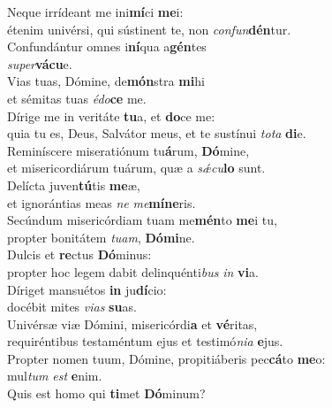 \evenverse Neque irrídeant me ini\textbf{mí}ci \textbf{me}i:~\*\\
\evenverse étenim univérsi, qui sústinent te, non \textit{con}\textit{fun}\textbf{dén}tur.\\
\oddverse Confundántur omnes i\textbf{ní}qua a\textbf{gén}tes~\*\\
\oddverse \textit{su}\textit{per}\textbf{vá}\textbf{cu}e.\\
\evenverse Vias tuas, Dómine, de\textbf{món}stra \textbf{mi}hi~\*\\
\evenverse et sémitas tuas \textit{é}\textit{do}\textbf{ce} me.\\
\oddverse Dírige me in veritáte \textbf{tu}a, et \textbf{do}ce me:~\*\\
\oddverse quia tu es, Deus, Salvátor meus, et te sustínui \textit{to}\textit{ta} \textbf{di}e.\\
\evenverse Reminíscere miseratiónum tu\textbf{á}rum, \textbf{Dó}mine,~\*\\
\evenverse et misericordiárum tuárum, quæ a \textit{sǽ}\textit{cu}\textbf{lo} sunt.\\
\oddverse Delícta juven\textbf{tú}tis \textbf{me}æ,~\*\\
\oddverse et ignorántias meas \textit{ne} \textit{me}\textbf{mí}\textbf{ne}ris.\\
\evenverse Secúndum misericórdiam tuam me\textbf{mén}to \textbf{me}i tu,~\*\\
\evenverse propter bonitátem \textit{tu}\textit{am}, \textbf{Dó}\textbf{mi}ne.\\
\oddverse Dulcis et \textbf{re}ctus \textbf{Dó}minus:~\*\\
\oddverse propter hoc legem dabit delinquénti\textit{bus} \textit{in} \textbf{vi}a.\\
\evenverse Díriget mansuétos \textbf{in} ju\textbf{dí}cio:~\*\\
\evenverse docébit mites \textit{vi}\textit{as} \textbf{su}as.\\
\oddverse Univérsæ viæ Dómini, misericórdi\textbf{a} et \textbf{vé}ritas,~\*\\
\oddverse requiréntibus testaméntum ejus et testimó\textit{ni}\textit{a} \textbf{e}jus.\\
\evenverse Propter nomen tuum, Dómine, propitiáberis pec\textbf{cá}to \textbf{me}o:~\*\\
\evenverse mul\textit{tum} \textit{est} \textbf{e}nim.\\
\oddverse Quis est homo qui \textbf{ti}met \textbf{Dó}minum?~\*\\
